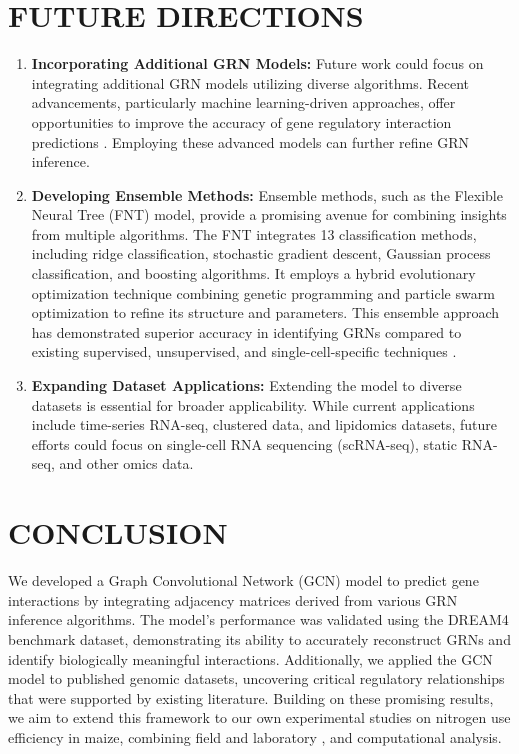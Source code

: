 \documentclass{article}
\begin{document}
\section{FUTURE DIRECTIONS}

\begin{enumerate}
    \item \textbf{Incorporating Additional GRN Models:} Future work could focus on integrating additional GRN models utilizing diverse algorithms. Recent advancements, particularly machine learning-driven approaches, offer opportunities to improve the accuracy of gene regulatory interaction predictions \cite{gmfgrn, yuan2020gcng}. Employing these advanced models can further refine GRN inference.

    \item \textbf{Developing Ensemble Methods:} Ensemble methods, such as the Flexible Neural Tree (FNT) model, provide a promising avenue for combining insights from multiple algorithms. The FNT integrates 13 classification methods, including ridge classification, stochastic gradient descent, Gaussian process classification, and boosting algorithms. It employs a hybrid evolutionary optimization technique combining genetic programming and particle swarm optimization to refine its structure and parameters. This ensemble approach has demonstrated superior accuracy in identifying GRNs compared to existing supervised, unsupervised, and single-cell-specific techniques \cite{cande2012evolution}.

    \item \textbf{Expanding Dataset Applications:} Extending the model to diverse datasets is essential for broader applicability. While current applications include time-series RNA-seq, clustered data, and lipidomics datasets, future efforts could focus on single-cell RNA sequencing (scRNA-seq), static RNA-seq, and other omics data. 
\end{enumerate}


\section{CONCLUSION}

We developed a Graph Convolutional Network (GCN) model to predict gene interactions by integrating adjacency matrices derived from various GRN inference algorithms. The model’s performance was validated using the DREAM4 benchmark dataset, demonstrating its ability to accurately reconstruct GRNs and identify biologically meaningful interactions. Additionally, we applied the GCN model to published genomic datasets, uncovering critical regulatory relationships that were supported by existing literature. Building on these promising results, we aim to extend this framework to our own experimental studies on nitrogen use efficiency in maize, combining field and laboratory , and computational analysis.

 
 
\end{document}
